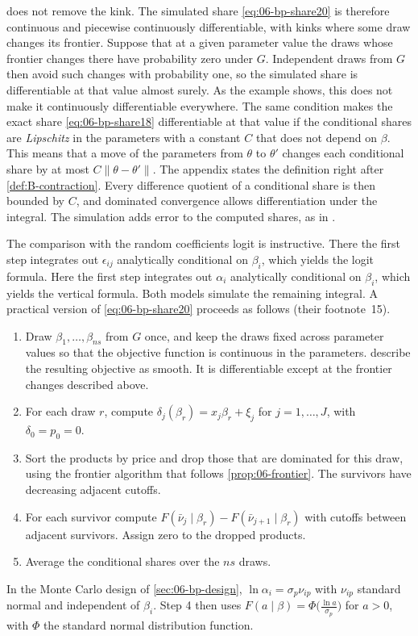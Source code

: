 does not remove the kink. The simulated share \eqref{eq:06-bp-share20} is therefore continuous and piecewise continuously
differentiable, with kinks where some draw changes its frontier. Suppose that at a given parameter value the draws
whose frontier changes there have probability zero under $G$. Independent draws from $G$ then avoid such changes with
probability one, so the simulated share is differentiable at that value almost surely. As the example shows, this
does not make it continuously differentiable everywhere. The same condition makes the exact share
\eqref{eq:06-bp-share18} differentiable at that value if the conditional shares are \emph{Lipschitz} in the parameters
with a constant $C$ that does not depend on $\beta$. This means that a move of the parameters from $\theta$ to
$\theta'$ changes each conditional share by at most $C\lVert \theta - \theta' \rVert$. The appendix states the
definition right after \cref{def:B-contraction}. Every difference quotient of a conditional share is then bounded by $C$,
and dominated convergence allows differentiation under the integral. The simulation adds error to the computed
shares, as in \citet{BerryLevinsohnPakes1995}.

The comparison with the random coefficients logit is instructive. There the first step integrates out $\epsilon_{ij}$
analytically conditional on $\beta_i$, which yields the logit formula. Here the first step integrates out $\alpha_i$
analytically conditional on $\beta_i$, which yields the vertical formula. Both models simulate the remaining
integral. A practical version of \eqref{eq:06-bp-share20} proceeds as follows (their footnote~15).
\begin{enumerate}
\item Draw $\beta_1, \dots, \beta_{ns}$ from $G$ once, and keep the draws fixed across parameter values so that the
objective function is continuous in the parameters. \citet[p.~13]{BerryPakes2007} describe the resulting objective
as smooth. It is differentiable except at the frontier changes described above.
\item For each draw $r$, compute $\delta_j(\beta_r) = x_j \beta_r + \xi_j$ for $j = 1, \dots, J$, with $\delta_0 = p_0 = 0$.
\item Sort the products by price and drop those that are dominated for this draw, using the frontier algorithm that
follows \cref{prop:06-frontier}. The survivors have decreasing adjacent cutoffs.
\item For each survivor compute $F(\bar\nu_j \mid \beta_r) - F(\bar\nu_{j+1} \mid \beta_r)$ with cutoffs between adjacent
survivors. Assign zero to the dropped products.
\item Average the conditional shares over the $ns$ draws.
\end{enumerate}
In the Monte Carlo design of \cref{sec:06-bp-design}, $\ln\alpha_i = \sigma_p \nu_{ip}$ with $\nu_{ip}$ standard normal and
independent of $\beta_i$. Step 4 then uses $F(a \mid \beta) = \Phi\bigl(\frac{\ln a}{\sigma_p}\bigr)$ for $a > 0$, with $\Phi$
the standard normal distribution function.

